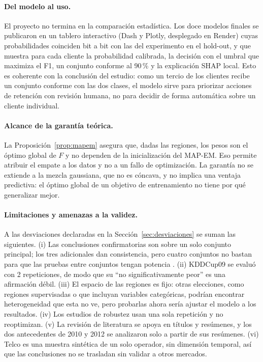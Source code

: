 \documentclass[11pt,a4paper]{article}
\begin{document}
\paragraph{Del modelo al uso.} El proyecto no termina en la comparación estadística. Los doce modelos finales se publicaron en un tablero interactivo (Dash y Plotly, desplegado en Render) cuyas probabilidades coinciden bit a bit con las del experimento en el hold-out, y que muestra para cada cliente la probabilidad calibrada, la decisión con el umbral que maximiza el F1, un conjunto conforme al 90\,\% y la explicación SHAP local. Esto es coherente con la conclusión del estudio: como un tercio de los clientes recibe un conjunto conforme con las dos clases, el modelo sirve para priorizar acciones de retención con revisión humana, no para decidir de forma automática sobre un cliente individual.

\paragraph{Alcance de la garantía teórica.} La Proposición~\ref{prop:mapem} asegura que, dadas las regiones, los pesos son el óptimo global de $F$ y no dependen de la inicialización del MAP-EM. Eso permite atribuir el empate a los datos y no a un fallo de optimización. La garantía no se extiende a la mezcla gaussiana, que no es cóncava, y no implica una ventaja predictiva: el óptimo global de un objetivo de entrenamiento no tiene por qué generalizar mejor.

\paragraph{Limitaciones y amenazas a la validez.} A las desviaciones declaradas en la Sección~\ref{sec:desviaciones} se suman las siguientes. (i) Las conclusiones confirmatorias son sobre un solo conjunto principal; los tres adicionales dan consistencia, pero cuatro conjuntos no bastan para que las pruebas entre conjuntos tengan potencia \cite{demsar2006}. (ii) KDDCup09 se evaluó con 2 repeticiones, de modo que su ``no significativamente peor'' es una afirmación débil. (iii) El espacio de las regiones es fijo: otras elecciones, como regiones supervisadas o que incluyan variables categóricas, podrían encontrar heterogeneidad que esta no ve, pero probarlas ahora sería ajustar el modelo a los resultados. (iv) Los estudios de robustez usan una sola repetición y no reoptimizan. (v) La revisión de literatura se apoya en títulos y resúmenes, y los dos antecedentes de 2010 y 2012 se analizaron solo a partir de sus resúmenes. (vi) Telco es una muestra sintética de un solo operador, sin dimensión temporal, así que las conclusiones no se trasladan sin validar a otros mercados.
\end{document}
